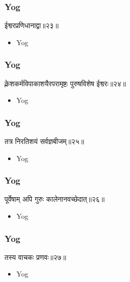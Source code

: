 \begin{frame}[fragile]\frametitle{Yog}
\begin{sanskrit}
ईश्वरप्रणिधानाद्वा॥२३॥
\end{sanskrit}
	\begin{itemize}
	\item Yog 
	\end{itemize}
\end{frame}

\begin{frame}[fragile]\frametitle{Yog}
\begin{sanskrit}
क्लेशकर्मविपाकाशयैरपरामृष्टः पुरुषविशेष ईश्वरः॥२४॥
\end{sanskrit}
	\begin{itemize}
	\item Yog 
	\end{itemize}
\end{frame}

\begin{frame}[fragile]\frametitle{Yog}
\begin{sanskrit}
तत्र निरतिशयं सर्वज्ञबीजम्॥२५॥
\end{sanskrit}
	\begin{itemize}
	\item Yog 
	\end{itemize}
\end{frame}

\begin{frame}[fragile]\frametitle{Yog}
\begin{sanskrit}
पूर्वेषाम् अपि गुरुः कालेनानवच्छेदात्॥२६॥
\end{sanskrit}
	\begin{itemize}
	\item Yog 
	\end{itemize}
\end{frame}

\begin{frame}[fragile]\frametitle{Yog}
\begin{sanskrit}
तस्य वाचकः प्रणवः॥२७॥
\end{sanskrit}
	\begin{itemize}
	\item Yog 
	\end{itemize}
\end{frame}


